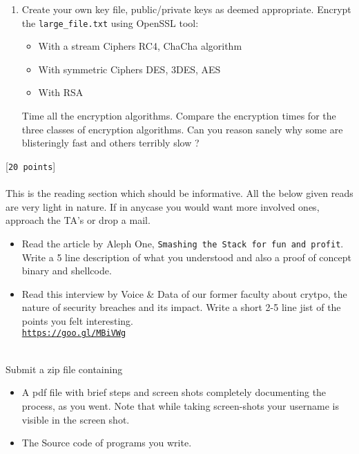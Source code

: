 \documentclass[11pt]{article}
\begin{document}
\begin{enumerate}
    \item {
    Create your own key file, public/private keys as deemed appropriate.
    Encrypt the \texttt{large\_file.txt} using OpenSSL tool:
    \begin{itemize}
        \item With a stream Ciphers RC4, ChaCha algorithm
        \item With symmetric Ciphers DES, 3DES, AES
        \item With RSA
    \end{itemize}
    Time all the encryption algorithms. Compare the encryption times for the three classes of encryption algorithms. Can you reason sanely why some are blisteringly fast and others terribly slow ?
    
    }
    
\end{enumerate}
 [\texttt{20 points}] \\\\
This is the reading section which should be informative. All the below given reads are very light in nature. If in anycase you would want more involved ones, approach the TA's or drop a mail.
\begin{itemize}
    \item {
    Read the article by Aleph One, \texttt{Smashing the Stack for fun and profit}. Write a 5 line description of what you understood and also a proof of concept binary and shellcode.
    }
    \item {
    Read this interview by Voice \& Data of our former faculty about crytpo, the nature of security breaches and its impact. Write a short 2-5 line jist of the  points you felt interesting.\\
    \href{https://goo.gl/MBiVWg}{\texttt{https://goo.gl/MBiVWg}}
    }
\end{itemize}
\vspace{1cm}
\hrulefill

 \\

\noindent Submit a zip file containing 
\begin{itemize}
    \item  A pdf file with brief steps and screen shots completely documenting the process, as you went. Note that while taking screen-shots your username is visible in the screen shot.
    \item  The Source code of programs you write. 
    
    \end{itemize}

\end{document}
